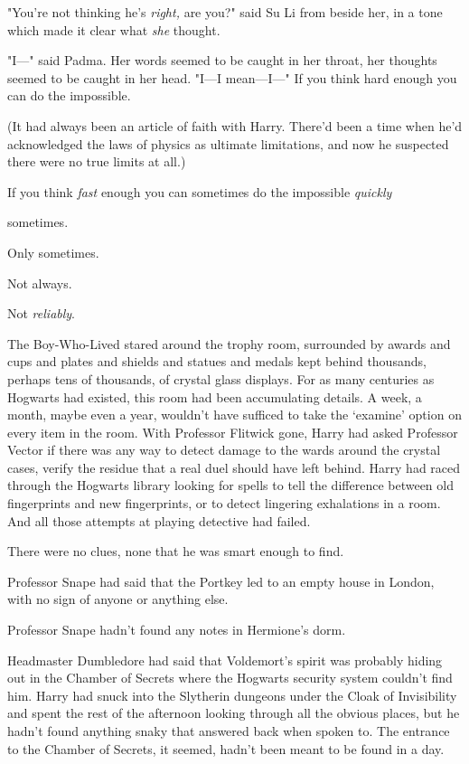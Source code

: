 "You're not thinking he's \emph{right,} are you?" said Su Li from beside her,
in a tone which made it clear what \emph{she} thought.

"I\mbox{---}" said Padma. Her words seemed to be caught in her throat, her thoughts
seemed to be caught in her head. "I---I mean---I\mbox{---}"
\sbreak
If you think hard enough you can do the impossible.

(It had always been an article of faith with Harry. There'd been a time when
he'd acknowledged the laws of physics as ultimate limitations, and now he
suspected there were no true limits at all.)

If you think \emph{fast} enough you can sometimes do the impossible
\emph{quickly}{\el}

{\el} sometimes.

Only sometimes.

Not always.

Not \emph{reliably}.

The Boy-Who-Lived stared around the trophy room, surrounded by awards and cups
and plates and shields and statues and medals kept behind thousands, perhaps
tens of thousands, of crystal glass displays. For as many centuries as Hogwarts
had existed, this room had been accumulating details. A week, a month, maybe
even a year, wouldn't have sufficed to take the `examine' option on every item
in the room. With Professor Flitwick gone, Harry had asked Professor Vector if
there was any way to detect damage to the wards around the crystal cases,
verify the residue that a real duel should have left behind. Harry had raced
through the Hogwarts library looking for spells to tell the difference between
old fingerprints and new fingerprints, or to detect lingering exhalations in a
room. And all those attempts at playing detective had failed.

There were no clues, none that he was smart enough to find.

Professor Snape had said that the Portkey led to an empty house in London, with
no sign of anyone or anything else.

Professor Snape hadn't found any notes in Hermione's dorm.

Headmaster Dumbledore had said that Voldemort's spirit was probably hiding out
in the Chamber of Secrets where the Hogwarts security system couldn't find him.
Harry had snuck into the Slytherin dungeons under the Cloak of Invisibility and
spent the rest of the afternoon looking through all the obvious places, but he
hadn't found anything snaky that answered back when spoken to. The entrance to
the Chamber of Secrets, it seemed, hadn't been meant to be found in a day.

